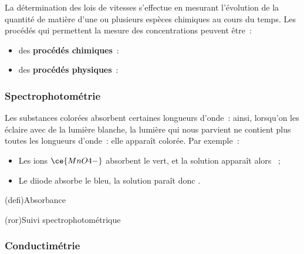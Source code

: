 \documentclass[../../main/main.tex]{subfiles}
\begin{document}
La détermination des lois de vitesses s'effectue en mesurant l'évolution de la
quantité de matière d'une ou plusieurs espèces chimiques au cours du temps. Les
procédés qui permettent la mesure des concentrations peuvent être~:

\begin{itemize}
	\item des \textbf{procédés chimiques}~:
	\item des \textbf{procédés physiques}~:
\end{itemize}

\subsubsection{Spectrophotométrie}
Les substances colorées absorbent certaines longueurs d'onde~: ainsi, lorsqu'on
les éclaire avec de la lumière blanche, la lumière qui nous parvient ne contient
plus toutes les longueurs d'onde~: elle apparaît colorée. Par exemple~:
\begin{itemize}
	\item Les ions $\ce{MnO4-}$ absorbent le vert, et la solution apparaît alors
	      ~;
	\item Le diiode absorbe le bleu, la solution paraît donc .
\end{itemize}

\begin{tcb}(defi){Absorbance}
\end{tcb}

\begin{tcb}[label=prop:spectro, halign=center](ror){Suivi spectrophotométrique}

\end{tcb}

\subsubsection{Conductimétrie}
\end{document}
